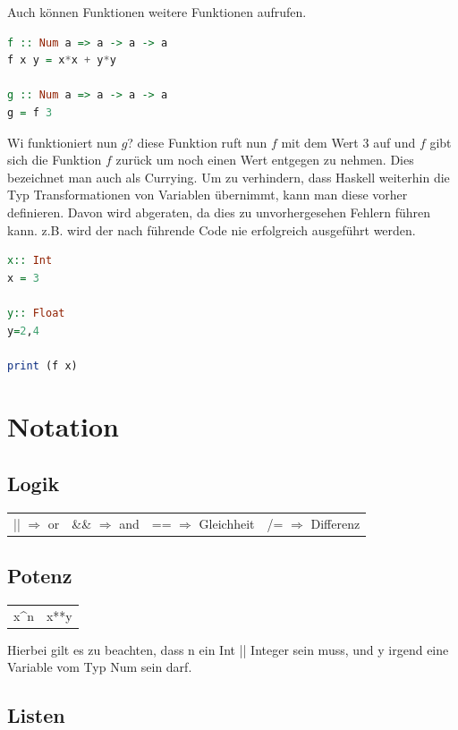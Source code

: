 Auch können Funktionen weitere Funktionen aufrufen.
\newline
\begin{lstlisting}[language=Haskell]  
f :: Num a => a -> a -> a 
f x y = x*x + y*y

g :: Num a => a -> a -> a 
g = f 3
\end{lstlisting}
\qquad\newline

Wi funktioniert nun $g$? diese Funktion ruft nun $f$ mit dem Wert 3 auf und $f$ gibt sich die Funktion $f$ zurück um noch einen Wert entgegen zu nehmen. Dies bezeichnet man auch als Currying. 
Um zu verhindern, dass Haskell weiterhin die Typ Transformationen von Variablen übernimmt, kann man diese vorher definieren. Davon wird abgeraten, da dies zu unvorhergesehen Fehlern führen kann. z.B. wird der nach führende Code nie erfolgreich ausgeführt werden. 
\newline
\begin{lstlisting}[language=Haskell]  
x:: Int
x = 3

y:: Float
y=2,4

print (f x)
\end{lstlisting}
\qquad\newline

\section{Notation}
\subsection{Logik}

\begin{tabular}{cccc}
|| $\Rightarrow$ or 	& \&\& $\Rightarrow$ and  & ==  $\Rightarrow$ Gleichheit & /= $\Rightarrow$ Differenz  \\ 
\end{tabular} 

\subsection{Potenz}
\begin{tabular}{cc}
 x\^{}n & x**y \\  
\end{tabular} 

Hierbei gilt es zu beachten, dass n ein Int || Integer sein muss, und y irgend eine Variable vom Typ Num sein darf. 

\subsection{Listen}

